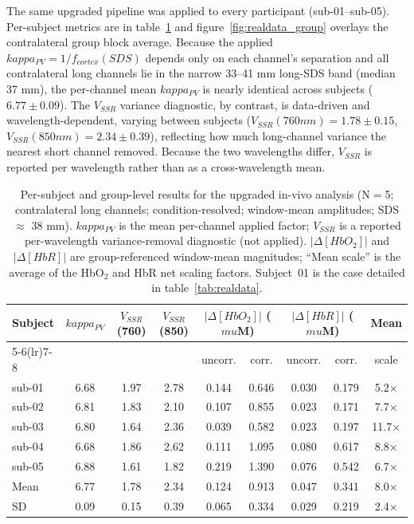 \documentclass[11pt]{article}
\def\kappa{kappa}%
\def\mu{mu}%
\def\mathrm#1{#1}%
\def\,{ }%
\begin{document}
The same upgraded pipeline was applied to every participant (sub-01--sub-05). Per-subject metrics are in table~\ref{tab:realdata_group} and figure~\ref{fig:realdata_group} overlays the contralateral group block average. Because the applied $\kappa_{\mathrm{PV}} = 1/f_{\mathrm{cortex}}(\mathrm{SDS})$ depends only on each channel's separation and all contralateral long channels lie in the narrow 33--41\,mm long-SDS band (median 37\,mm), the per-channel mean $\kappa_{\mathrm{PV}}$ is nearly identical across subjects ($6.77\pm0.09$). The $V_{\mathrm{SSR}}$ variance diagnostic, by contrast, is data-driven and wavelength-dependent, varying between subjects ($V_{\mathrm{SSR}}(760\,\mathrm{nm}) = 1.78 \pm 0.15$, $V_{\mathrm{SSR}}(850\,\mathrm{nm}) = 2.34 \pm 0.39$), reflecting how much long-channel variance the nearest short channel removed. Because the two wavelengths differ, $V_{\mathrm{SSR}}$ is reported per wavelength rather than as a cross-wavelength mean.

\begin{table}[ht]
\centering
\caption{Per-subject and group-level results for the upgraded in-vivo analysis (N$=$5; contralateral long channels; condition-resolved; window-mean amplitudes; SDS $\approx$ 38\,mm). $\kappa_{\mathrm{PV}}$ is the mean per-channel applied factor; $V_{\mathrm{SSR}}$ is a reported per-wavelength variance-removal diagnostic (not applied). $|\Delta[\mathrm{HbO}_2]|$ and $|\Delta[\mathrm{HbR}]|$ are group-referenced window-mean magnitudes; ``Mean scale'' is the average of the HbO$_2$ and HbR net scaling factors. Subject~01 is the case detailed in table~\ref{tab:realdata}.}
\label{tab:realdata_group}
\small
\begin{tabular}{@{}lcccccccc@{}}
\toprule
\textbf{Subject} & $\kappa_{\mathrm{PV}}$ & $V_{\mathrm{SSR}}$(760) & $V_{\mathrm{SSR}}$(850) &
\multicolumn{2}{c}{$|\Delta[\mathrm{HbO}_2]|$ ($\mu$M)} &
\multicolumn{2}{c}{$|\Delta[\mathrm{HbR}]|$ ($\mu$M)} & Mean \\
\cmidrule(lr){5-6}\cmidrule(lr){7-8}
 & & & & uncorr. & corr. & uncorr. & corr. & scale \\
\midrule
sub-01 & 6.68 & 1.97 & 2.78 & 0.144 & 0.646 & 0.030 & 0.179 & 5.2$\times$ \\
sub-02 & 6.81 & 1.83 & 2.10 & 0.107 & 0.855 & 0.023 & 0.171 & 7.7$\times$ \\
sub-03 & 6.80 & 1.64 & 2.36 & 0.039 & 0.582 & 0.023 & 0.197 & 11.7$\times$ \\
sub-04 & 6.68 & 1.86 & 2.62 & 0.111 & 1.095 & 0.080 & 0.617 & 8.8$\times$ \\
sub-05 & 6.88 & 1.61 & 1.82 & 0.219 & 1.390 & 0.076 & 0.542 & 6.7$\times$ \\
\midrule
Mean & 6.77 & 1.78 & 2.34 & 0.124 & 0.913 & 0.047 & 0.341 & 8.0$\times$ \\
SD & 0.09 & 0.15 & 0.39 & 0.065 & 0.334 & 0.029 & 0.219 & 2.4$\times$ \\
\bottomrule
\end{tabular}
\end{table}
\end{document}
